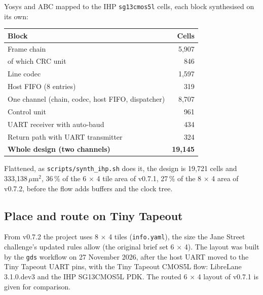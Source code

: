 \documentclass[11pt,a4paper]{article}
\newcommand{\sig}[1]{\texttt{#1}}
\begin{document}
Yosys and ABC mapped to the IHP \sig{sg13cmos5l} cells, each block synthesised on its own:

\begin{center}
\begin{tabular}{@{}lr@{}}
\toprule
Block & Cells \\
\midrule
Frame chain & 5,907 \\
\quad of which CRC unit & 846 \\
Line codec & 1,597 \\
Host FIFO (8 entries) & 319 \\
One channel (chain, codec, host FIFO, dispatcher) & 8,707 \\
Control unit & 961 \\
UART receiver with auto-baud & 434 \\
Return path with UART transmitter & 324 \\
\midrule
\textbf{Whole design (two channels)} & \textbf{19,145} \\
\bottomrule
\end{tabular}
\end{center}

Flattened, as \sig{scripts/synth\_ihp.sh} does it, the design is 19,721 cells and 333,138\,$\mu$m$^2$, 36\,\% of the 6 $\times$ 4 tile area of v0.7.1, 27\,\% of the 8 $\times$ 4 area of v0.7.2, before the flow adds buffers and the clock tree.

\subsection{Place and route on Tiny Tapeout}

From v0.7.2 the project uses 8 $\times$ 4 tiles (\sig{info.yaml}), the size the Jane Street challenge's updated rules allow (the original brief set 6 $\times$ 4). The layout was built by the \sig{gds} workflow on 27 November 2026, after the host UART moved to the Tiny Tapeout UART pins, with the Tiny Tapeout CMOS5L flow: LibreLane 3.1.0.dev3 and the IHP SG13CMOS5L PDK. The routed 6 $\times$ 4 layout of v0.7.1 is given for comparison.
\end{document}

